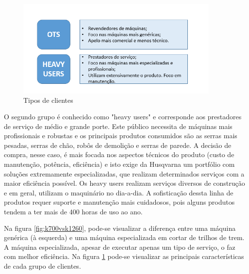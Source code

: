 \documentclass[12pt]{article}
\begin{document}
\begin{figure}[h!]
	\centering
	\includegraphics[width=0.9\textwidth]{img/clientes-pt.png}
	\caption{Tipos de clientes}
	\label{fig:tipo-clientes}
\end{figure}

	O segundo grupo é conhecido como "heavy users" e corresponde aos prestadores de serviço de médio e grande porte. Este público necessita de máquinas mais profissionais e robustas e os principais produtos consumidos são as serras mais pesadas, serras de chão, robôs de demolição e serras de parede. A decisão de compra, nesse caso, é mais focada nos aspectos técnicos do produto (custo de manutenção, potência, eficiência) e isto exige da Husqvarna um portfólio com soluções extremamente especializadas, que realizam determinados serviços com a maior eficiência possível. Os heavy users realizam serviços diversos de construção e em geral, utilizam o maquinário no dia-a-dia. A sofisticação dessta linha de produtos requer suporte e manutenção mais cuidadosos, pois alguns produtos tendem a ter mais de 400 horas de uso ao ano. 
	
	Na figura \ref{fig:k700vsk1260}, pode-se visualizar a diferença entre uma máquina genérica (à esquerda) e uma máquina especializada em cortar de trilhos de trem. A máquina especializada, apesar de executar apenas um tipo de serviço, o faz com melhor eficiência. Na figura \ref{fig:tipo-clientes} pode-se visualizar as principais características de cada grupo de clientes.
	



\end{document}
